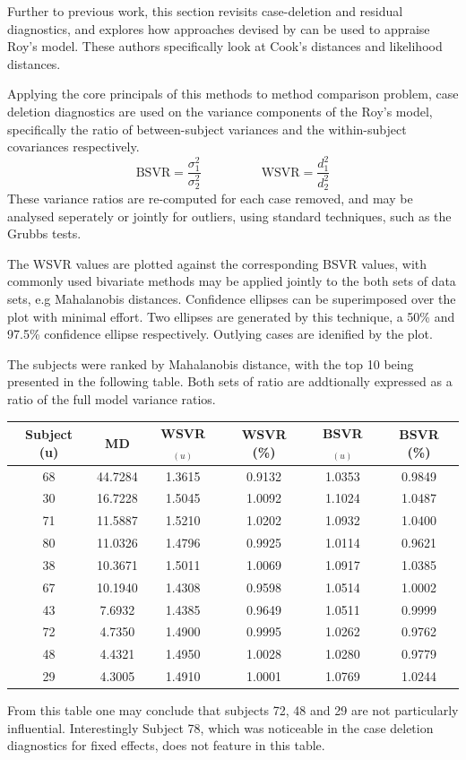 \documentclass[12pt, a4paper]{report}
\theoremstyle{definition}
\theoremstyle{remark}
\begin{document}
Further to previous work, this section revisits case-deletion and residual diagnostics, and explores how approaches devised by \citet{Galecki} can be used to appraise Roy's model. These authors specifically look at Cook's distances and likelihood distances.
%




Applying the core principals of this methods to method comparison problem, case deletion diagnostics are used on the variance components of the Roy's model, specifically the ratio of between-subject variances and the within-subject covariances respectively.
\[ \mbox{BSVR} = \frac{\sigma^2_1}{\sigma^2_2} \phantom{makespace}  \mbox{WSVR} = \frac{d^2_1}{d^2_2} \]
These variance ratios are re-computed for each case removed, and may be analysed seperately or jointly for outliers, using standard techniques, such as the Grubbs tests.


The WSVR values are plotted against the corresponding BSVR values, with commonly used bivariate methods may be applied jointly to the both sets of data sets, e.g Mahalanobis distances. Confidence ellipses can be superimposed over the plot with minimal effort. Two ellipses are generated by this technique, a 50\% and 97.5\% confidence ellipse respectively. Outlying cases are idenified by the plot. 

The subjects were ranked by Mahalanobis distance, with the top 10 being presented in the following table. Both sets of ratio are addtionally expressed as a ratio of the full model variance ratios.
\begin{center}
\begin{tabular}{|c|c|c|c|c|c|}
\hline
Subject (u) &  MD & WSVR$_{(u)}$ & WSVR (\%) & BSVR$_{(u)}$   & BSVR (\%)     \\ \hline \hline
68 & 44.7284   & 1.3615  & 0.9132   & 1.0353  & 0.9849 \\ \hline
30 & 16.7228   & 1.5045  & 1.0092   & 1.1024  & 1.0487 \\ \hline
71 & 11.5887   & 1.5210  & 1.0202   & 1.0932  & 1.0400 \\ \hline
80 & 11.0326   & 1.4796  & 0.9925   & 1.0114  & 0.9621 \\ \hline
38 & 10.3671   & 1.5011  & 1.0069   & 1.0917  & 1.0385 \\ \hline
67 & 10.1940   & 1.4308  & 0.9598   & 1.0514  & 1.0002 \\ \hline
43  & 7.6932   & 1.4385  & 0.9649   & 1.0511  & 0.9999 \\ \hline
72  & 4.7350   & 1.4900  & 0.9995   & 1.0262  & 0.9762 \\ \hline
48  & 4.4321   & 1.4950  & 1.0028   & 1.0280  & 0.9779 \\ \hline
29  & 4.3005   & 1.4910  & 1.0001   & 1.0769  & 1.0244 \\ \hline
\end{tabular}
\end{center}
From this table one may conclude that subjects 72, 48 and 29 are not particularly influential. Interestingly Subject 78, which was noticeable in the case deletion diagnostics for fixed effects, does not feature in this table.
\end{document}
